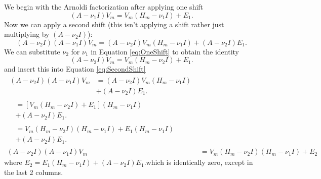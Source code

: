 \documentclass[10pt,letterpaper]{article}
\begin{document}
\begin{enumerate}[(a)]
        We begin with the Arnoldi factorization after applying one shift
        \begin{equation}
            \left(A-\nu_1I\right)V_m = V_m\left(H_m-\nu_1I\right) + E_1.
            \label{eq:OneShift}
        \end{equation}
        Now we can apply a second shift (this isn't applying a shift rather just multiplying by $\left(A-\nu_2I\right)$):
        \begin{equation}
            \left(A-\nu_2I\right)\left(A-\nu_1I\right)V_m = \left(A-\nu_2I\right)V_m\left(H_m-\nu_1I\right) + \left(A-\nu_2I\right)E_1.
            \label{eq:SecondShift}
        \end{equation}
        We can substitute $\nu_2$ for $\nu_1$ in Equation \ref{eq:OneShift} to obtain the identity
        \begin{equation}
            \left(A-\nu_2I\right)V_m = V_m\left(H_m-\nu_2I\right) + E_1.
        \end{equation}
        and insert this into Equation \ref{eq:SecondShift}
        \begin{subequations}
            \begin{align}
                \begin{split}
                    \left(A-\nu_2I\right)\left(A-\nu_1I\right)V_m &= \left(A-\nu_2I\right)V_m\left(H_m-\nu_1I\right) \\
                     &+ \left(A-\nu_2I\right)E_1.
                \end{split} \\
                \begin{split}
                    &= \left[V_m\left(H_m-\nu_2I\right) + E_1\right]\left(H_m-\nu_1I\right) \\
                    &+ \left(A-\nu_2I\right)E_1.
                \end{split} \\
                \begin{split}
                    &= V_m\left(H_m-\nu_2I\right)\left(H_m-\nu_1I\right) + E_1\left(H_m-\nu_1I\right) \\
                    &+ \left(A-\nu_2I\right)E_1.
                \end{split} \\
                    \left(A-\nu_2I\right)\left(A-\nu_1I\right)V_m &= V_m\left(H_m-\nu_2I\right)\left(H_m-\nu_1I\right) + E_2
            \end{align}
        \end{subequations}
        where $E_2 = E_1\left(H_m-\nu_1I\right) + \left(A-\nu_2I\right)E_1$.which is identically zero, except in the last 2 columns.


\end{enumerate}
\end{document}
